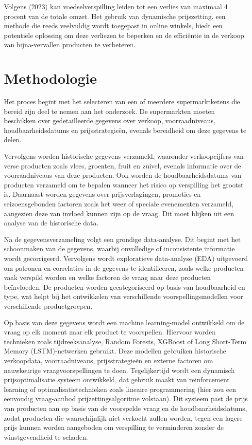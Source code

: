 Volgens\textcite{sarma2023} (2023) kan voedselverspilling leiden tot een verlies van maximaal 4 procent van de totale omzet.
Het gebruik van dynamische prijszetting, een methode die reeds veelvuldig wordt toegepast in online winkels, biedt een potentiële oplossing om deze verliezen te beperken en de efficiëntie in de verkoop van bijna-vervallen producten te verbeteren.


\section{Methodologie}%
\label{sec:methodologie}
Het proces begint met het selecteren van een of meerdere supermarktketens die bereid zijn deel te nemen aan het onderzoek.
De supermarkten moeten beschikken over gedetailleerde gegevens over verkoop, voorraadniveaus, houdbaarheidsdatums en prijsstrategieën,
evenals bereidheid om deze gegevens te delen.


Vervolgens worden historische gegevens verzameld,
waaronder verkoopcijfers van verse producten zoals vlees, groenten, fruit en zuivel,
evenals informatie over de voorraadniveaus van deze producten.
Ook worden de houdbaarheidsdatums van producten verzameld om te bepalen wanneer het risico op verspilling het grootst is.
Daarnaast worden gegevens over prijsverlagingen, promoties en seizoensgebonden factoren zoals het weer of speciale evenementen verzameld,
aangezien deze van invloed kunnen zijn op de vraag.
Dit moet blijken uit een analyse van de historische data.


Na de gegevensverzameling volgt een grondige data-analyse.
Dit begint met het schoonmaken van de gegevens, waarbij onvolledige of inconsistente informatie wordt gecorrigeerd.
Vervolgens wordt exploratieve data-analyse (EDA) uitgevoerd om patronen en correlaties in de gegevens te identificeren,
zoals welke producten vaak verspild worden en welke factoren de vraag naar deze producten beïnvloeden.
De producten worden gecategoriseerd op basis van houdbaarheid en type, wat helpt bij het ontwikkelen van verschillende voorspellingsmodellen voor verschillende productgroepen.

Op basis van deze gegevens wordt een machine learning-model ontwikkeld om de vraag op elk moment naar elk product te voorspellen.
Hiervoor worden technieken zoals tijdreeksanalyse, Random Forests, XGBoost of Long Short-Term Memory (LSTM)-netwerken gebruikt.
Deze modellen gebruiken historische verkoopdata, voorraadniveaus, prijsstrategieën en externe factoren om nauwkeurige vraagvoorspellingen te doen.
Tegelijkertijd wordt een dynamisch prijsoptimalisatie systeem ontwikkeld, dat gebruik maakt van reinforcement learning of optimalisatietechnieken zoals lineaire programmering (hier zou een eenvoudig vraag-aanbod prijzettingsalgoritme volstaan).
Dit systeem past de prijs van producten aan op basis van de voorspelde vraag en de houdbaarheidsdatums,
zodat producten die waarschijnlijk niet verkocht zullen worden, tegen een lagere prijs kunnen worden aangeboden om verspilling te verminderen zonder de winstgevendheid te schaden.

